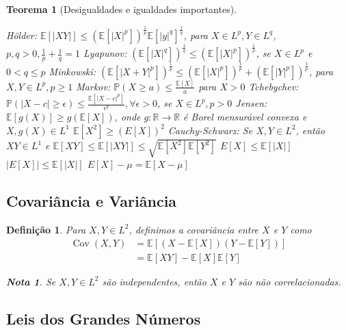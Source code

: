 \documentclass[12pt,a4paper,answers]{article}
\numberwithin{equation}{section} %
\renewcommand{\Re}{\mathbb{R}}
\renewcommand{\P}{\mathbb{P}}
\newcommand{\E}{\mathbb{E}}
\DeclareMathOperator{\cov}{Cov}
\theoremstyle{thm_estilo}
\newtheorem{theorem}{Teorema}[section]
\newtheorem{definition}{Definição}[section]
\theoremstyle{thm_note_est}
\newtheorem*{note}{Nota}
\begin{document}
\begin{theorem}[Desigualdades e igualdades importantes]
	\leavevmode
	\begin{outline}[enumerate]
		\1 Hölder: $\E[|XY|]\leq (\E[|X|^p])^\frac{1}{p}\E[|y|^q]^\frac{1}{q}$, para $X\in L^p, Y\in L^q$,  $p,q>0, \frac{1}{p}+\frac{1}{q}=1$
		\1 Lyapunov: $(\E[|X|^q])^\frac{1}{q} \leq (\E[|X|^p])^\frac{1}{p}$, se $X \in L^p$ e $0<q\leq p$
		\1 Minkowski: $(\E[|X+Y|^p])^\frac{1}{p} \leq (\E[|X|^p])^\frac{1}{p} + (\E[|Y|^p])^\frac{1}{p}$, para $X,Y \in L^p, p\geq1$
		\1 Markov: $\P(X\geq a) \leq \frac{\E[X]}{a}$ para $X>0$
		\1 Tchebychev: $\P(|X-c|\geq\epsilon) \leq \frac{\E[|X-c|^p]}{\epsilon^p}, \forall \epsilon>0$, se $X\in L^p, p>0$
		\1 Jensen: $\E[g(X)]\geq g(\E[X])$, onde $g: \Re\to\Re$ é Borel mensurável convexa e $X,g(X)\in L^1$
			\2 \(\E[X^2] \geq (E[X])^2 \)
		\1 Cauchy-Schwarz: Se $X,Y\in L^2$, então $XY \in L^1$ e $\E[XY] \leq \E[|XY|] \leq \sqrt{\E[X^2]\E[Y^2]}$
		\1 \(E[X] \leq \E[|X|]\)
		\1 \(|E[X]|\leq \E[|X|]\)
		\1 \( E[X]-\mu =\E[X-\mu]\)
	\end{outline}
\end{theorem}

\subsection{Covariância e Variância}

\begin{definition}
	Para $X,Y \in L^2$, definimos a covariância entre $X$ e $Y$ como
	\begin{align}
		\cov(X,Y) &= \E[(X-\E[X])(Y-\E[Y])] \\
		&= \E[XY]-\E[X]\E[Y]
	\end{align}
	\begin{note}
		Se $X,Y\in L^2$ são independentes, então $X$ e $Y$ são não correlacionadas.
	\end{note}
\end{definition}

\subsection{Leis dos Grandes Números}
\end{document}
